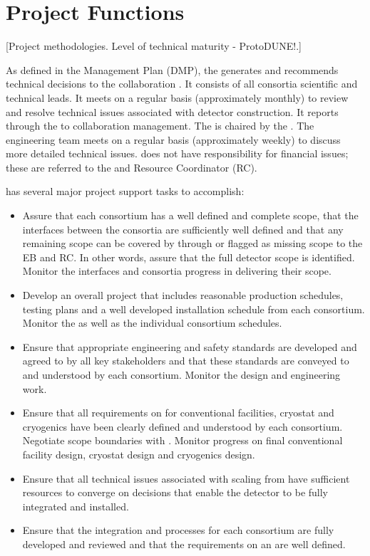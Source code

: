 \chapter{Project Functions}
\label{vl:tc-project}

[Project methodologies. Level of technical maturity - ProtoDUNE!.]

As defined in the  Management Plan (DMP), the 
 generates and recommends technical decisions to the
 collaboration .
It consists of all consortia scientific and technical leads. It meets
on a regular basis (approximately monthly) to review and resolve
technical issues associated with detector construction. It reports
through the  to collaboration management. The  
is chaired by the  . The
 engineering team meets on a regular basis (approximately weekly)
to discuss more detailed technical issues.  does not have
responsibility for financial issues; these are referred to
the  and Resource Coordinator (RC).

 has several major project support tasks to accomplish:
\begin{itemize}
\item Assure that each consortium has a well defined and complete
  scope, that the interfaces between the consortia are sufficiently
  well defined and that any remaining scope can be covered by 
  through  or flagged as missing scope to the EB and RC. In
  other words, assure that the full detector scope is
  identified. Monitor the interfaces and consortia progress in
  delivering their scope.
\item Develop an overall project 
  that includes reasonable production schedules, testing plans and a
  well developed installation schedule from each consortium. Monitor
  the  as well as the individual consortium schedules.
\item Ensure that appropriate engineering and safety standards are
  developed and agreed to by all key stakeholders and that these
  standards are conveyed to and understood by each
  consortium. Monitor the design and engineering work.
\item Ensure that all  requirements on  for
  conventional facilities, cryostat and cryogenics have been clearly
  defined and understood by each consortium. Negotiate scope
  boundaries with . Monitor  progress on
  final conventional facility design, cryostat design and cryogenics
  design.
\item Ensure that all technical issues associated with scaling from
   have sufficient resources to converge on
  decisions that enable the detector to be fully integrated and
  installed.
\item Ensure that the integration and  processes for each
  consortium are fully developed and reviewed and that the
  requirements on an  are well defined.
\end{itemize}

